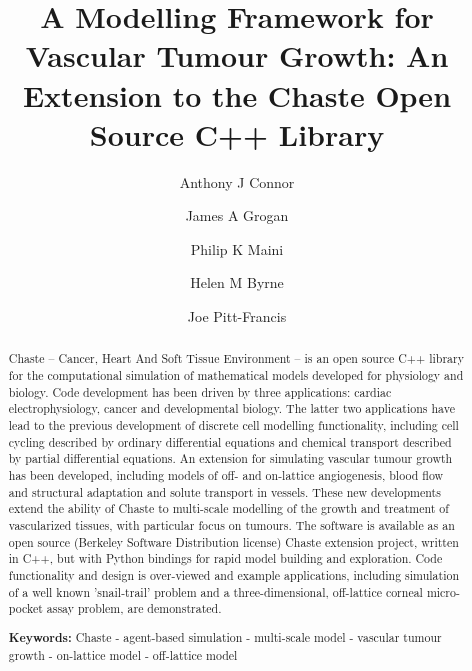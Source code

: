 \documentclass[superscriptaddress, a4paper]{article}
\begin{document}
\title{A Modelling Framework for Vascular Tumour Growth: An Extension to the Chaste Open Source C++ Library}

\author[1,2]{Anthony J Connor}
\author[1]{James A Grogan}
\author[1]{Philip K Maini}
\author[1,2]{Helen M Byrne}
\author[2]{Joe Pitt-Francis}
 
  
\date{}
  
\maketitle

\begin{abstract}
Chaste -- Cancer, Heart And Soft Tissue Environment -- is an open source C++ library for the computational simulation of mathematical models developed for physiology and biology. Code development has been driven by three applications: cardiac electrophysiology, cancer and developmental biology. The latter two applications have lead to the previous development of discrete cell modelling functionality, including cell cycling described by ordinary differential equations and chemical transport described by partial differential equations. An extension for simulating vascular tumour growth has been developed, including models of off- and on-lattice angiogenesis, blood flow and structural adaptation and solute transport in vessels. These new developments extend the ability of Chaste to multi-scale modelling of the growth and treatment of vascularized tissues, with particular focus on tumours. The software is available as an open source (Berkeley Software Distribution license) Chaste extension project, written in C++, but with Python bindings for rapid model building and exploration. Code functionality and design is over-viewed and example applications, including simulation of a well known 'snail-trail' problem and a three-dimensional, off-lattice corneal micro-pocket assay problem, are demonstrated.

\smallskip
\noindent \textbf{Keywords:} Chaste - agent-based simulation - multi-scale model - vascular tumour growth - on-lattice model - off-lattice model

\end{abstract}

\vspace{1.5cm}
\end{document}
